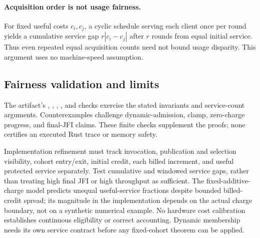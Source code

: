 \paragraph{Acquisition order is not usage fairness.}
For fixed useful costs $c_i,c_j$, a cyclic schedule serving each client once
per round yields a cumulative service gap $r|c_i-c_j|$ after $r$ rounds from
equal initial service. Thus even repeated equal acquisition counts need
not bound usage disparity. This argument uses no machine-speed assumption.

\subsection{Fairness validation and limits}
\label{sec:fairness-validation}
The artifact's , ,
, , and
 checks exercise the stated invariants and
service-count arguments. Counterexamples challenge dynamic-admission,
clamp, zero-charge progress, and final-JFI claims. These finite checks
supplement the proofs; none certifies an executed Rust trace or memory safety.

Implementation refinement must track invocation, publication and selection
visibility, cohort entry/exit, initial credit, each billed increment, and
useful protected service separately. Test cumulative and windowed service
gaps, rather than treating high final JFI or high throughput as sufficient.
The fixed-additive-charge model predicts unequal useful-service fractions
despite bounded billed-credit spread; its magnitude in the implementation
depends on the actual charge boundary, not on a synthetic numerical example.
No hardware cost calibration establishes continuous eligibility or correct
accounting. Dynamic membership needs its own service contract before any
fixed-cohort theorem can be applied.
